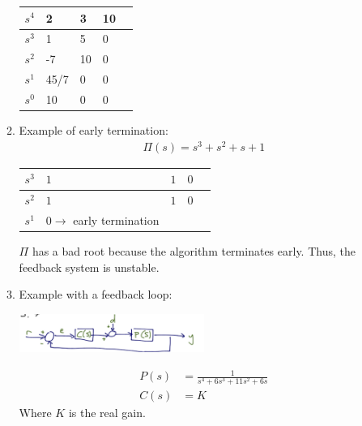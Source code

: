 \begin{enumerate}
\begin{enumerate}
\begin{table}[h]
\begin{tabular}{ | l || l | l | l | l | }
                            $s^4$ & 2 & 3 & 10 \\ \hline
                            $s^3$ & 1 & 5 & 0 \\ \hline
                            $s^2$ & -7 & 10 & 0 \\ \hline
                            $s^1$ & 45/7 & 0 & 0 \\ \hline
                            $s^0$ & 10 & 0 & 0 \\ \hline
                        \end{tabular}
                    \end{table}

                \item Example of early termination:
                    \begin{align*}
                        \Pi(s) = s^3 + s^2 + s + 1
                    \end{align*}
                    \begin{table}[h]
                        \centering
                        \begin{tabular}{ | l || l | l | l | l | }
                            \hline
                            \hline
                            $s^3$ & $1$ & $1$ & $0$ \\ \hline
                            $s^2$ & $1$ & $1$ & $0$ \\ \hline
                            $s^1$ & $0 \to$ early termination & & \\ \hline
                        \end{tabular}
                    \end{table}
                    $\Pi$ has a bad root because the algorithm terminates early. Thus, the feedback system is unstable.

                \item Example with a feedback loop:

                    \begin{center}\includegraphics[width=0.5\textwidth,keepaspectratio]{images/5-7.png}\end{center}

                    \begin{align*}
                        P(s) &= \frac{1}{s^4 + 6s^3 + 11s^2 + 6s} \\
                        C(s) &= K
                    \end{align*}
                    Where $K$ is the real gain.


\end{enumerate}
\end{enumerate}
